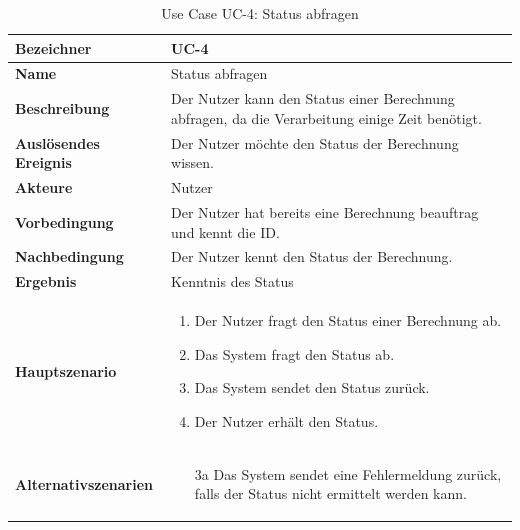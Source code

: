 \begin{table}[ht]
\centering
  \begin{tabular}{ l | p{10cm} }
	\hline
	\rowcolor{gray}
	\textbf{Bezeichner}	&	\textbf{UC-4}\\ \hline
	\textbf{Name}			&	Status abfragen\\ \hline
	\textbf{Beschreibung}	&	Der Nutzer kann den Status einer Berechnung abfragen, da die Verarbeitung einige Zeit benötigt.\\ \hline
	\textbf{Auslösendes Ereignis}&	Der Nutzer möchte den Status der Berechnung wissen.\\ \hline
	\textbf{Akteure}		&	Nutzer\\ \hline
	\textbf{Vorbedingung}	&	Der Nutzer hat bereits eine Berechnung beauftrag und kennt die ID.\\ \hline
	\textbf{Nachbedingung}	&	Der Nutzer kennt den Status der Berechnung.\\ \hline
	\textbf{Ergebnis}		&	Kenntnis des Status\\ \hline
	\textbf{Hauptszenario}	&	\begin{enumerate}
					\item Der Nutzer fragt den Status einer Berechnung ab.
					\item Das System fragt den Status ab.
					\item Das System sendet den Status zurück.
					\item Der Nutzer erhält den Status.
					\end{enumerate}
					\\ \hline
	\textbf{Alternativszenarien}	&	\begin{enumerate}
					\item[3a] Das System sendet eine Fehlermeldung zurück, falls der Status nicht ermittelt werden kann.
					\end{enumerate}
					\\ \hline
  \end{tabular}
   \caption{Use Case UC-4: Status abfragen}\label{table:use_case_4}
\end{table}

